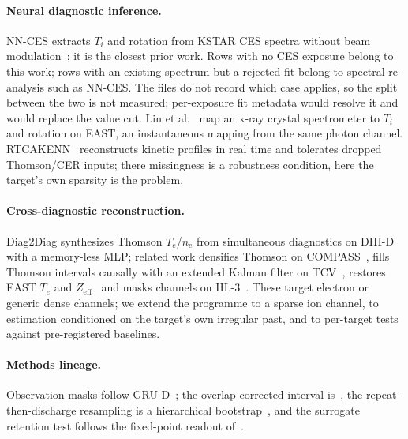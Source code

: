 \documentclass[10pt,twocolumn,letterpaper]{article}
\newcommand{\Ti}{\ensuremath{T_i}}
\begin{document}
\paragraph{Neural diagnostic inference.} NN-CES extracts \Ti{} and rotation from
KSTAR CES spectra without beam modulation~\citep{Lee2026NeuralNetworkbased}; it is the
closest prior work. Rows with no CES exposure belong to this work; rows with an
existing spectrum but a rejected fit belong to spectral re-analysis such as NN-CES. The
files do not record which case applies, so the split between the two is not measured;
per-exposure fit metadata would resolve it and would replace the value cut. Lin et
al.~\citep{Lin2024PredictionPlasma} map an x-ray crystal spectrometer to \Ti{} and
rotation on EAST, an instantaneous mapping from the same photon channel.
RTCAKENN~\citep{Shousha2023MachineLearningbased} reconstructs kinetic profiles in real
time and tolerates dropped Thomson/CER inputs; there missingness is a robustness
condition, here the target's own sparsity is the problem.

\paragraph{Cross-diagnostic reconstruction.} Diag2Diag synthesizes Thomson
$T_e$/$n_e$ from simultaneous diagnostics on
DIII-D~\citep{Jalalvand2025MultimodalSuperresolution} with a memory-less MLP;
related work densifies Thomson on COMPASS~\citep{Imrek2026TemporalSuperresolution},
fills Thomson intervals causally with an extended Kalman filter on
TCV~\citep{Pastore2023ModelBased}, restores EAST $T_e$ and
$Z_\mathrm{eff}$~\citep{Wang2025TimeSeries,Jia2026TimeSeries} and masks channels on
HL-3~\citep{Yang2026FusionmaeSelfsupervised}. These target electron or generic dense
channels; we extend the programme to a sparse ion channel, to estimation conditioned on
the target's own irregular past, and to per-target tests against pre-registered
baselines.

\paragraph{Methods lineage.} Observation masks follow
GRU-D~\citep{Che2018RecurrentNeural}; the overlap-corrected interval
is~\citep{Nadeau2003Inference}, the repeat-then-discharge resampling is a hierarchical
bootstrap~\citep{Saravanan2020Hierarchical}, and the surrogate retention test follows
the fixed-point readout of~\citep{Maheswaranathan2020HowRecurrent}.
\end{document}
